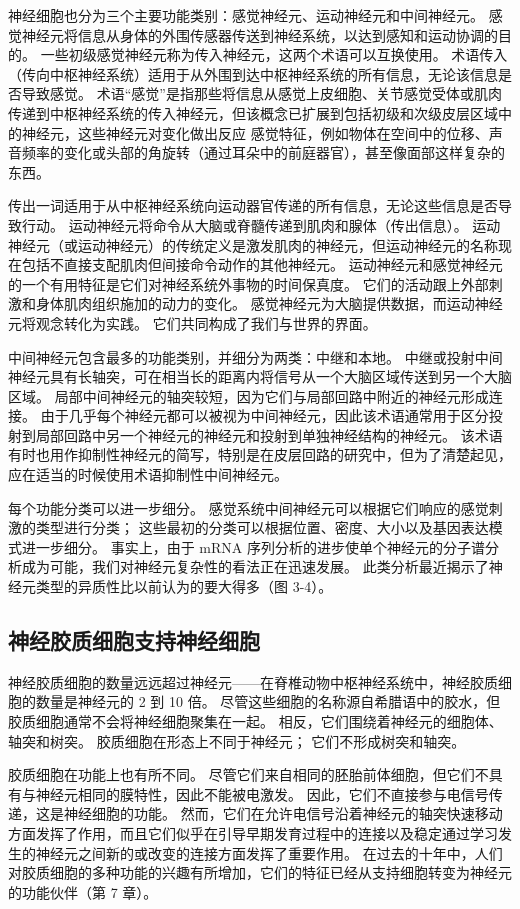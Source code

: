 神经细胞也分为三个主要功能类别：感觉神经元、运动神经元和中间神经元。 感觉神经元将信息从身体的外围传感器传送到神经系统，以达到感知和运动协调的目的。 一些初级感觉神经元称为传入神经元，这两个术语可以互换使用。 术语传入（传向中枢神经系统）适用于从外围到达中枢神经系统的所有信息，无论该信息是否导致感觉。 术语“感觉”是指那些将信息从感觉上皮细胞、关节感觉受体或肌肉传递到中枢神经系统的传入神经元，但该概念已扩展到包括初级和次级皮层区域中的神经元，这些神经元对变化做出反应 感觉特征，例如物体在空间中的位移、声音频率的变化或头部的角旋转（通过耳朵中的前庭器官），甚至像面部这样复杂的东西。

传出一词适用于从中枢神经系统向运动器官传递的所有信息，无论这些信息是否导致行动。 运动神经元将命令从大脑或脊髓传递到肌肉和腺体（传出信息）。 运动神经元（或运动神经元）的传统定义是激发肌肉的神经元，但运动神经元的名称现在包括不直接支配肌肉但间接命令动作的其他神经元。 运动神经元和感觉神经元的一个有用特征是它们对神经系统外事物的时间保真度。 它们的活动跟上外部刺激和身体肌肉组织施加的动力的变化。 感觉神经元为大脑提供数据，而运动神经元将观念转化为实践。 它们共同构成了我们与世界的界面。

中间神经元包含最多的功能类别，并细分为两类：中继和本地。 中继或投射中间神经元具有长轴突，可在相当长的距离内将信号从一个大脑区域传送到另一个大脑区域。 局部中间神经元的轴突较短，因为它们与局部回路中附近的神经元形成连接。 由于几乎每个神经元都可以被视为中间神经元，因此该术语通常用于区分投射到局部回路中另一个神经元的神经元和投射到单独神经结构的神经元。 该术语有时也用作抑制性神经元的简写，特别是在皮层回路的研究中，但为了清楚起见，应在适当的时候使用术语抑制性中间神经元。

每个功能分类可以进一步细分。 感觉系统中间神经元可以根据它们响应的感觉刺激的类型进行分类； 这些最初的分类可以根据位置、密度、大小以及基因表达模式进一步细分。 事实上，由于 mRNA 序列分析的进步使单个神经元的分子谱分析成为可能，我们对神经元复杂性的看法正在迅速发展。 此类分析最近揭示了神经元类型的异质性比以前认为的要大得多（图 3-4）。

\subsection{神经胶质细胞支持神经细胞}
神经胶质细胞的数量远远超过神经元——在脊椎动物中枢神经系统中，神经胶质细胞的数量是神经元的 2 到 10 倍。 尽管这些细胞的名称源自希腊语中的胶水，但胶质细胞通常不会将神经细胞聚集在一起。 相反，它们围绕着神经元的细胞体、轴突和树突。 胶质细胞在形态上不同于神经元； 它们不形成树突和轴突。

胶质细胞在功能上也有所不同。 尽管它们来自相同的胚胎前体细胞，但它们不具有与神经元相同的膜特性，因此不能被电激发。 因此，它们不直接参与电信号传递，这是神经细胞的功能。 然而，它们在允许电信号沿着神经元的轴突快速移动方面发挥了作用，而且它们似乎在引导早期发育过程中的连接以及稳定通过学习发生的神经元之间新的或改变的连接方面发挥了重要作用。 在过去的十年中，人们对胶质细胞的多种功能的兴趣有所增加，它们的特征已经从支持细胞转变为神经元的功能伙伴（第 7 章）。

